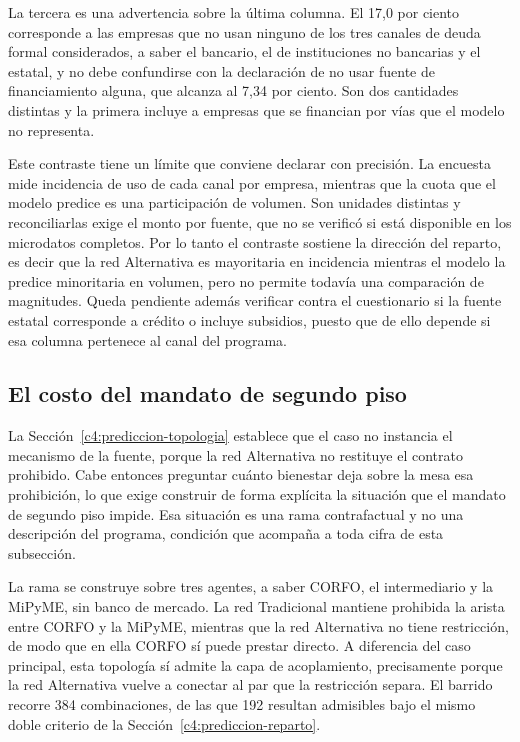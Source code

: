 La tercera es una advertencia sobre la última columna. El 17,0 por ciento corresponde a las empresas que no usan ninguno de los tres canales de deuda formal considerados, a saber el bancario, el de instituciones no bancarias y el estatal, y no debe confundirse con la declaración de no usar fuente de financiamiento alguna, que alcanza al 7,34 por ciento. Son dos cantidades distintas y la primera incluye a empresas que se financian por vías que el modelo no representa.

Este contraste tiene un límite que conviene declarar con precisión. La encuesta mide incidencia de uso de cada canal por empresa, mientras que la cuota que el modelo predice es una participación de volumen. Son unidades distintas y reconciliarlas exige el monto por fuente, que no se verificó si está disponible en los microdatos completos. Por lo tanto el contraste sostiene la dirección del reparto, es decir que la red Alternativa es mayoritaria en incidencia mientras el modelo la predice minoritaria en volumen, pero no permite todavía una comparación de magnitudes. Queda pendiente además verificar contra el cuestionario si la fuente estatal corresponde a crédito o incluye subsidios, puesto que de ello depende si esa columna pertenece al canal del programa.

\subsection{El costo del mandato de segundo piso}
\label{c4:prediccion-contrafactual}

La Sección~\ref{c4:prediccion-topologia} establece que el caso no instancia el mecanismo de la fuente, porque la red Alternativa no restituye el contrato prohibido. Cabe entonces preguntar cuánto bienestar deja sobre la mesa esa prohibición, lo que exige construir de forma explícita la situación que el mandato de segundo piso impide. Esa situación es una rama contrafactual y no una descripción del programa, condición que acompaña a toda cifra de esta subsección.

La rama se construye sobre tres agentes, a saber CORFO, el intermediario y la MiPyME, sin banco de mercado. La red Tradicional mantiene prohibida la arista entre CORFO y la MiPyME, mientras que la red Alternativa no tiene restricción, de modo que en ella CORFO sí puede prestar directo. A diferencia del caso principal, esta topología sí admite la capa de acoplamiento, precisamente porque la red Alternativa vuelve a conectar al par que la restricción separa. El barrido recorre 384 combinaciones, de las que 192 resultan admisibles bajo el mismo doble criterio de la Sección~\ref{c4:prediccion-reparto}.

